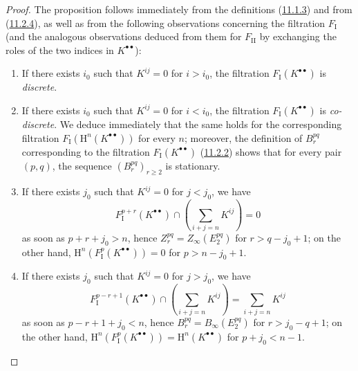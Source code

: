 \begin{proof}
The proposition follows immediately from the definitions
(\hyperref[0.11.1.3]{11.1.3}) and from
(\hyperref[0.11.2.4]{11.2.4}), as well as from the following observations
concerning the filtration $F_{\mathrm I}$ (and the analogous observations
deduced from them for $F_{\mathrm{II}}$ by exchanging the roles of the two indices
in $K^{\bullet\bullet}$):
\begin{enumerate}
  \item[$1^\circ$] If there exists $i_0$ such that $K^{ij}=0$ for $i>i_0$, the
    filtration $F_{\mathrm I}(K^{\bullet\bullet})$ is \emph{discrete}.
  \item[$2^\circ$] If there exists $i_0$ such that $K^{ij}=0$ for $i<i_0$, the
    filtration $F_{\mathrm I}(K^{\bullet\bullet})$ is \emph{co-discrete}. We
    deduce immediately that the same holds for the corresponding filtration
    $F_{\mathrm I}(\mathrm H^n(K^{\bullet\bullet}))$ for every $n$;
    moreover, the definition of $B_r^{pq}$ corresponding to the filtration
    $F_{\mathrm I}(K^{\bullet\bullet})$
    (\hyperref[0.11.2.2]{11.2.2}) shows that for every pair $(p,q)$, the
    sequence $(B_r^{pq})_{r\geq2}$ is stationary.
  \item[$3^\circ$] If there exists $j_0$ such that $K^{ij}=0$ for $j<j_0$, we have
    \[
      F_{\mathrm I}^{p+r}(K^{\bullet\bullet})
      \cap\left(\sum_{i+j=n}K^{ij}\right)=0
    \]
    as soon as $p+r+j_0>n$, hence
    $Z_r^{pq}=Z_\infty(E_2^{pq})$ for $r>q-j_0+1$; on the other hand,
    $\mathrm H^n(F_{\mathrm I}^p(K^{\bullet\bullet}))=0$ for
    $p>n-j_0+1$.
  \item[$4^\circ$] If there exists $j_0$ such that $K^{ij}=0$ for $j>j_0$, we have
    \[
      F_{\mathrm I}^{p-r+1}(K^{\bullet\bullet})
      \cap\left(\sum_{i+j=n}K^{ij}\right)=\sum_{i+j=n}K^{ij}
    \]
    as soon as $p-r+1+j_0<n$, hence
    $B_r^{pq}=B_\infty(E_2^{pq})$ for $r>j_0-q+1$; on the other hand,
    $\mathrm H^n(F_{\mathrm I}^p(K^{\bullet\bullet}))
    =\mathrm H^n(K^{\bullet\bullet})$ for $p+j_0<n-1$.
\end{enumerate}
\end{proof}


